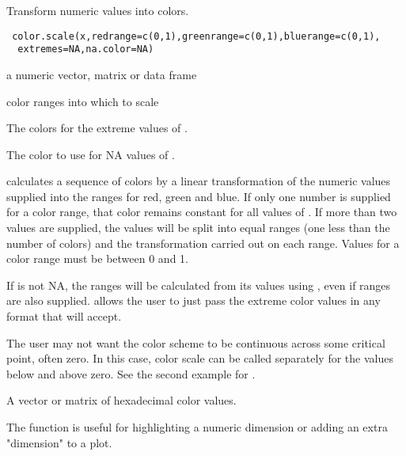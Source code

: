 \begin{Description}\relax
Transform numeric values into colors.
\end{Description}
\begin{Usage}
\begin{verbatim}
 color.scale(x,redrange=c(0,1),greenrange=c(0,1),bluerange=c(0,1),
  extremes=NA,na.color=NA)
\end{verbatim}
\end{Usage}
\begin{Arguments}
\begin{ldescription}
\item[\code{x}] a numeric vector, matrix or data frame
\item[\code{redrange,greenrange,bluerange}] color ranges into which 
to scale 
\item[\code{extremes}] The colors for the extreme values of .
\item[\code{na.color}] The color to use for NA values of .
\end{ldescription}
\end{Arguments}
\begin{Details}\relax
{} calculates a sequence of colors by a linear
transformation of the numeric values supplied into the ranges 
for red, green and blue. If only one number is supplied for a
color range, that color remains constant for all values of .
If more than two values are supplied, the  values will be
split into equal ranges (one less than the number of colors) and 
the transformation carried out on each range. Values for a color
range must be between 0 and 1.

If  is not NA, the ranges will be calculated from
its values using , even if ranges are also supplied.
 allows the user to just pass the extreme color values
in any format that  will accept.

The user may not want the color scheme to be continuous across some
critical point, often zero. In this case, color scale can be called
separately for the values below and above zero. See the second example
for .
\end{Details}
\begin{Value}
A vector or matrix of hexadecimal color values.
\end{Value}
\begin{Note}\relax
The function is useful for highlighting a numeric dimension or adding
an extra "dimension" to a plot.
\end{Note}
